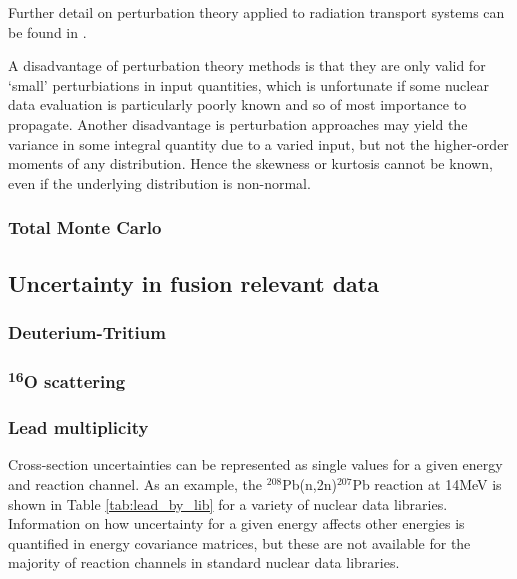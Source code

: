 Further detail on perturbation theory applied to radiation transport systems can be found in \cite{Sabouri2013}.

A disadvantage of perturbation theory methods is that they are only valid for `small' perturbiations in input quantities, which is unfortunate if some nuclear data evaluation is particularly poorly known and so of most importance to propagate. Another disadvantage is perturbation approaches may yield the variance in some integral quantity due to a varied input, but not the higher-order moments of any distribution. Hence the skewness or kurtosis cannot be known, even if the underlying distribution is non-normal.


\subsubsection{Total Monte Carlo}

\subsection{Uncertainty in fusion relevant data}
  \cite{Forrest2011}
\subsubsection{Deuterium-Tritium}
\subsubsection{\textsuperscript{16}O scattering}
\subsubsection{Lead multiplicity}

Cross-section uncertainties can be represented as single values for a given energy and reaction channel. As an example, the $^{208}$Pb(n,2n)$^{207}$Pb reaction at 14MeV is shown in Table \ref{tab:lead_by_lib} for a variety of nuclear data libraries. Information on how uncertainty for a given energy affects other energies is quantified in energy covariance matrices, but these are not available for the majority of reaction channels in standard nuclear data libraries.

